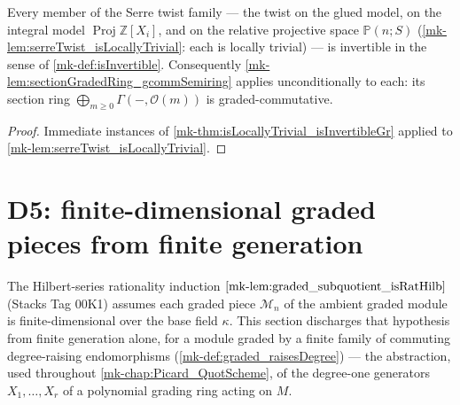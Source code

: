 \begin{corollary}
  \label{mk-cor:serreTwist_isInvertibleGr}
  \leanok
  Every member of the Serre twist family --- the twist on the glued
  model, on the integral model \(\operatorname{Proj}\mathbb{Z}[X_i]\),
  and on the relative projective space \(\mathbb{P}(n; S)\)
  (\ref{mk-lem:serreTwist_isLocallyTrivial}: each is locally trivial) ---
  is invertible in the sense of \ref{mk-def:isInvertible}. Consequently
  \ref{mk-lem:sectionGradedRing_gcommSemiring} applies unconditionally to
  each: its section ring \(\bigoplus_{m \ge 0} \Gamma(-, \mathcal{O}(m))\)
  is graded-commutative.
\end{corollary}
\begin{proof}
  \leanok
  Immediate instances of \ref{mk-thm:isLocallyTrivial_isInvertibleGr}
  applied to \ref{mk-lem:serreTwist_isLocallyTrivial}.
\end{proof}

\section{D5: finite-dimensional graded pieces from finite generation}
\label{mk-sec:sgr_graded_pieces_finite}

The Hilbert-series rationality induction \(\ref{mk-lem:graded_subquotient_isRatHilb}\)
(Stacks Tag 00K1) assumes each graded piece \(\mathcal{M}_n\) of the ambient
graded module is finite-dimensional over the base field \(\kappa\). This
section discharges that hypothesis from finite generation alone, for a
module graded by a finite family of commuting degree-raising endomorphisms
(\ref{mk-def:graded_raisesDegree}) --- the abstraction, used throughout
\ref{mk-chap:Picard_QuotScheme}, of the degree-one generators \(X_1,
\dots, X_r\) of a polynomial grading ring acting on \(M\).

